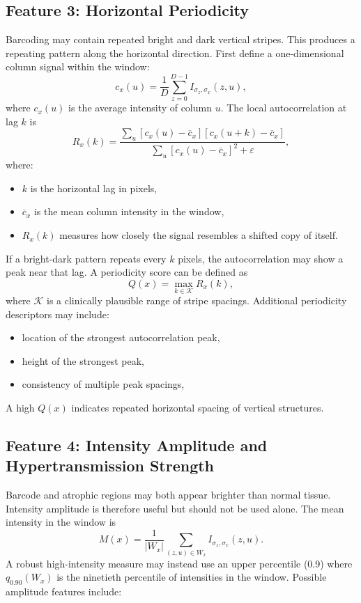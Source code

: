 \documentclass[11pt]{article}
\begin{document}
\subsection{Feature 3: Horizontal Periodicity}
Barcoding may contain repeated bright and dark vertical stripes. This produces
a repeating pattern along the horizontal direction.
First define a one-dimensional column signal within the window:
\[
c_x(u)
=
\frac{1}{D}
\sum_{z=0}^{D-1}
I_{\sigma_z,\sigma_x}(z,u),
\]
where \(c_x(u)\) is the average intensity of column \(u\).
The local autocorrelation at lag \(k\) is
\[
R_x(k)
=
\frac{
\sum_u
\left[
c_x(u)-\overline{c}_x
\right]
\left[
c_x(u+k)-\overline{c}_x
\right]
}{
\sum_u
\left[
c_x(u)-\overline{c}_x
\right]^2
+
\varepsilon
},
\]
where:
\begin{itemize}
    \item \(k\) is the horizontal lag in pixels,
    \item \(\overline{c}_x\) is the mean column intensity in the window,
    \item \(R_x(k)\) measures how closely the signal resembles a shifted copy
    of itself.
\end{itemize}

If a bright-dark pattern repeats every \(k\) pixels, the autocorrelation may
show a peak near that lag.
A periodicity score can be defined as
\[
Q(x)
=
\max_{k\in\mathcal{K}}
R_x(k),
\]
where \(\mathcal{K}\) is a clinically plausible range of stripe spacings.
Additional periodicity descriptors may include:
\begin{itemize}
    \item location of the strongest autocorrelation peak,
    \item height of the strongest peak,
    \item consistency of multiple peak spacings,
\end{itemize}
A high \(Q(x)\) indicates repeated horizontal spacing of vertical structures.


\subsection{Feature 4: Intensity Amplitude and Hypertransmission Strength}
Barcode and atrophic regions may both appear brighter than normal tissue.
Intensity amplitude is therefore useful but should not be used alone.
The mean intensity in the window is
\[
M(x)
=
\frac{1}{|W_x|}
\sum_{(z,u)\in W_x}
I_{\sigma_z,\sigma_x}(z,u).
\]
A robust high-intensity measure may instead use an upper percentile (0.9)
where \(q_{0.90}(W_x)\) is the ninetieth percentile of intensities in the
window.
Possible amplitude features include:
\end{document}
